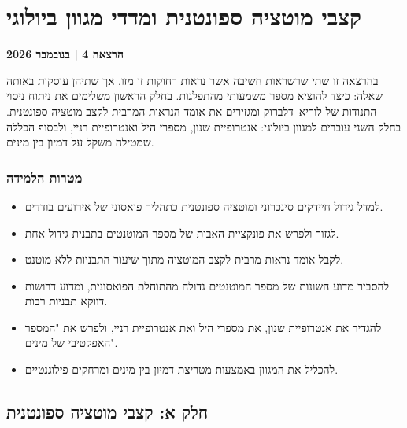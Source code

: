 
\chapter{קצבי מוטציה ספונטנית ומדדי מגוון ביולוגי}\label{chap:he04}
\noindent\textbf{הרצאה 4 \enspace| בנובמבר 2026}

בהרצאה זו שתי שרשראות חשיבה אשר נראות רחוקות זו מזו, אך שתיהן עוסקות באותה שאלה: כיצד להוציא מספר משמעותי מהתפלגות. בחלק הראשון משלימים את ניתוח ניסוי התנודות של לוריא--דלברוק ומגזירים את אומד הנראות המרבית לקצב מוטציה ספונטנית. בחלק השני עוברים למגוון ביולוגי: אנטרופיית שנון, מספרי היל ואנטרופיית רניי, ולבסוף הכללה שמטילה משקל על דמיון בין מינים.

\subsection*{מטרות הלמידה}
\begin{itemize}
\item למדל גידול חיידקים סינכרוני ומוטציה ספונטנית כתהליך פואסוני של אירועים בודדים.
\item לגזור ולפרש את פונקציית האבות של מספר המוטנטים בתבנית גידול אחת.
\item לקבל אומד נראות מרבית לקצב המוטציה מתוך שיעור התבניות ללא מוטנט.
\item להסביר מדוע השונות של מספר המוטנטים גדולה מהתוחלת הפואסונית, ומדוע דרושות דווקא תבניות רבות.
\item להגדיר את אנטרופיית שנון, את מספרי היל ואת אנטרופיית רניי, ולפרש את "המספר האפקטיבי של מינים".
\item להכליל את המגוון באמצעות מטריצת דמיון בין מינים ומרחקים פילוגנטיים.
\end{itemize}

\section{חלק א: קצבי מוטציה ספונטנית}

